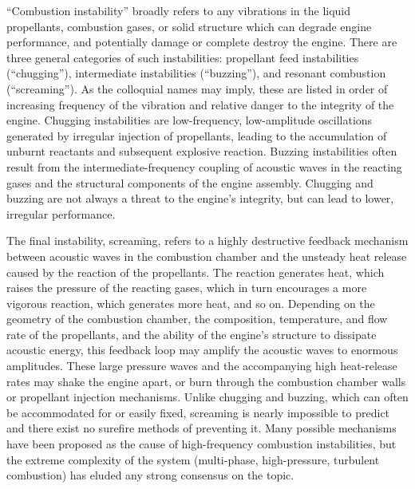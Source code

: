 ``Combustion instability'' broadly refers to any vibrations in the liquid propellants, combustion gases, or solid structure which can degrade engine performance, and potentially damage or complete destroy the engine. There are three general categories of such instabilities: propellant feed instabilities (``chugging''), intermediate instabilities (``buzzing''), and resonant combustion (``screaming''). As the colloquial names may imply, these are listed in order of increasing frequency of the vibration and relative danger to the integrity of the engine. Chugging instabilities are low-frequency, low-amplitude oscillations generated by irregular injection of propellants, leading to the accumulation of unburnt reactants and subsequent explosive reaction. Buzzing instabilities often result from the intermediate-frequency coupling of acoustic waves in the reacting gases and the structural components of the engine assembly. Chugging and buzzing are not always a threat to the engine's integrity, but can lead to lower, irregular performance.

The final instability, screaming, refers to a highly destructive feedback mechanism between acoustic waves in the combustion chamber and the unsteady heat release caused by the reaction of the propellants. The reaction generates heat, which raises the pressure of the reacting gases, which in turn encourages a more vigorous reaction, which generates more heat, and so on. Depending on the geometry of the combustion chamber, the composition, temperature, and flow rate of the propellants, and the ability of the engine's structure to dissipate acoustic energy, this feedback loop may amplify the acoustic waves to enormous amplitudes. These large pressure waves and the accompanying high heat-release rates may shake the engine apart, or burn through the combustion chamber walls or propellant injection mechanisms. Unlike chugging and buzzing, which can often be accommodated for or easily fixed, screaming is nearly impossible to predict and there exist no surefire methods of preventing it. Many possible mechanisms have been proposed as the cause of high-frequency combustion instabilities, but the extreme complexity of the system (multi-phase, high-pressure, turbulent combustion) has eluded any strong consensus on the topic.

